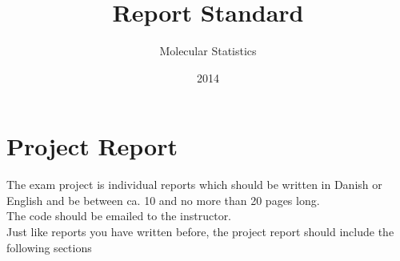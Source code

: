 \documentclass{article}
\title{Report Standard}
\author{Molecular Statistics}
\date{2014}
\begin{document}


\maketitle

\section*{Project Report}

The exam project is individual reports which should be written in Danish or English and be between ca. 10 and no more than 20 pages long.\\

The code should be emailed to the instructor.\\

Just like reports you have written before, the project report should include the following sections
\end{document}
